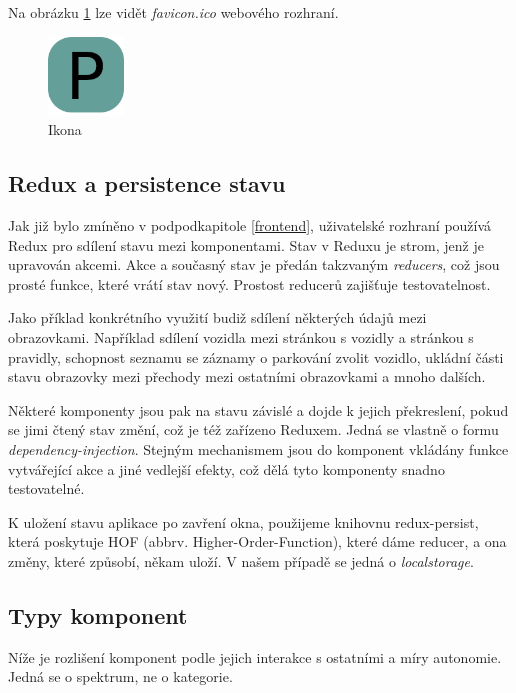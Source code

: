Na obrázku \ref{fig:favicon} lze vidět \textit{favicon.ico} webového rozhraní.

\begin{figure}[htb!]
  \centering
  \includegraphics[width=20mm]{../img/favicon.png}
  \caption{Ikona}
  \label{fig:favicon}
\end{figure}

\subsection{Redux a persistence stavu}

\noindent
Jak již bylo zmíněno v podpodkapitole \ref{frontend}, uživatelské rozhraní používá Redux pro sdílení stavu mezi komponentami.
Stav v Reduxu je strom, jenž je upravován akcemi. Akce a současný stav je předán takzvaným \textit{reducers}, což jsou prosté funkce,
které vrátí stav nový. \citep[][]{ReduxCore} Prostost reducerů zajišťuje testovatelnost.

Jako příklad konkrétního využití budiž sdílení některých údajů mezi obrazovkami.
Například sdílení vozidla mezi stránkou s vozidly a stránkou s pravidly, schopnost seznamu se záznamy o parkování
zvolit vozidlo, ukládní části stavu obrazovky mezi přechody mezi ostatními obrazovkami a mnoho dalších.

Některé komponenty jsou pak na stavu závislé a dojde k jejich překreslení, pokud se jimi čtený stav změní, což je též zařízeno
Reduxem. Jedná se vlastně o formu \textit{dependency-injection}. Stejným mechanismem jsou do komponent vkládány
funkce vytvářející akce a jiné vedlejší efekty, což dělá tyto komponenty snadno testovatelné.

K uložení stavu aplikace po zavření okna, použijeme knihovnu redux-persist, která poskytuje
HOF (abbrv. Higher-Order-Function), které dáme reducer, a ona změny, které způsobí, někam uloží. \citep[][]{reduxpersist}
V našem případě se jedná o \textit{localstorage}.

\subsection{Typy komponent}

\noindent
Níže je rozlišení komponent podle jejich interakce s ostatními a míry autonomie.
Jedná se o spektrum, ne o kategorie.

